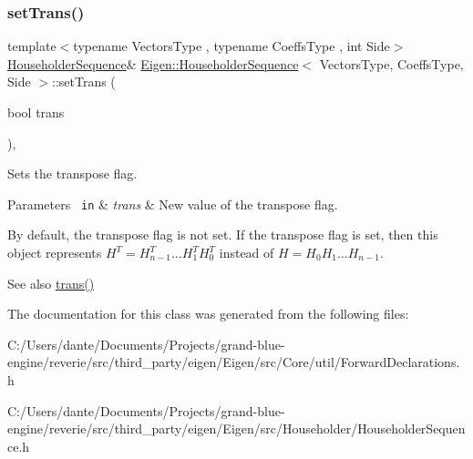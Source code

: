 \subsubsection{\texorpdfstring{setTrans()}{setTrans()}}
{\footnotesize\ttfamily template$<$typename Vectors\+Type , typename Coeffs\+Type , int Side$>$ \\
\mbox{\hyperlink{class_eigen_1_1_householder_sequence}{Householder\+Sequence}}\& \mbox{\hyperlink{class_eigen_1_1_householder_sequence}{Eigen\+::\+Householder\+Sequence}}$<$ Vectors\+Type, Coeffs\+Type, Side $>$\+::set\+Trans (\begin{DoxyParamCaption}\item[{bool}]{trans }\end{DoxyParamCaption})\hspace{0.3cm}{\ttfamily [inline]}, {\ttfamily [protected]}}



Sets the transpose flag. 


\begin{DoxyParams}[1]{Parameters}
\mbox{\texttt{ in}}  & {\em trans} & New value of the transpose flag.\\
\hline
\end{DoxyParams}
By default, the transpose flag is not set. If the transpose flag is set, then this object represents $ H^T = H_{n-1}^T \ldots H_1^T H_0^T $ instead of $ H = H_0 H_1 \ldots H_{n-1} $.

\begin{DoxySeeAlso}{See also}
\mbox{\hyperlink{class_eigen_1_1_householder_sequence_ad61c9b10d95c26b7397ccb47f4d80b08}{trans()}} 
\end{DoxySeeAlso}


The documentation for this class was generated from the following files\+:\begin{DoxyCompactItemize}
\item 
C\+:/\+Users/dante/\+Documents/\+Projects/grand-\/blue-\/engine/reverie/src/third\+\_\+party/eigen/\+Eigen/src/\+Core/util/Forward\+Declarations.\+h\item 
C\+:/\+Users/dante/\+Documents/\+Projects/grand-\/blue-\/engine/reverie/src/third\+\_\+party/eigen/\+Eigen/src/\+Householder/Householder\+Sequence.\+h\end{DoxyCompactItemize}
